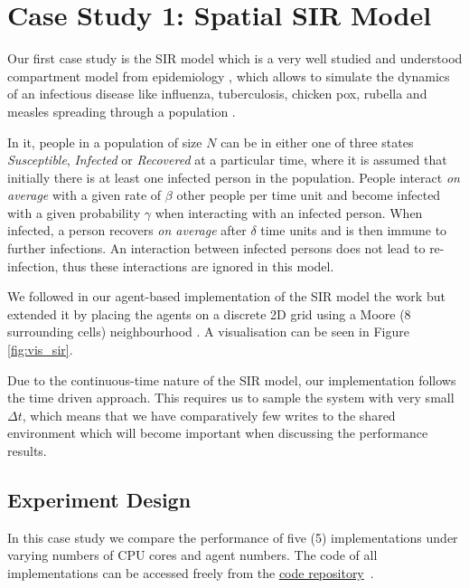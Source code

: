 \section{Case Study 1: Spatial SIR Model} %
\label{sec:cs_sir}

Our first case study is the SIR model which is a very well studied and understood compartment model from epidemiology \cite{kermack_contribution_1927}, which allows to simulate the dynamics of an infectious disease like influenza, tuberculosis, chicken pox, rubella and measles spreading through a population \cite{enns_its_2010}.

In it, people in a population of size $N$ can be in either one of three states \textit{Susceptible}, \textit{Infected} or \textit{Recovered} at a particular time, where it is assumed that initially there is at least one infected person in the population. People interact \textit{on average} with a given rate of $\beta$ other people per time unit and become infected with a given probability $\gamma$ when interacting with an infected person. When infected, a person recovers \textit{on average} after $\delta$ time units and is then immune to further infections. An interaction between infected persons does not lead to re-infection, thus these interactions are ignored in this model. 

We followed in our agent-based implementation of the SIR model the work \cite{macal_agent-based_2010} but extended it by placing the agents on a discrete 2D grid using a Moore (8 surrounding cells) neighbourhood \cite{thaler_pure_2018}. A visualisation can be seen in Figure \ref{fig:vis_sir}.

Due to the continuous-time nature of the SIR model, our implementation follows the time driven \cite{meyer_event-driven_2014} approach. This requires us to sample the system with very small $\Delta t$, which means that we have comparatively few writes to the shared environment which will become important when discussing the performance results.

\subsection{Experiment Design}
In this case study we compare the performance of five (5) implementations under varying numbers of CPU cores and agent numbers. The code of all implementations can be accessed freely from the \href{https://github.com/thalerjonathan/haskell-stm-sir}{code repository}~\cite{thaler_stm_sir_repository}.

